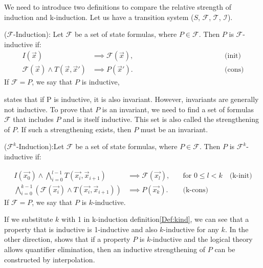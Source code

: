 We need to introduce two definitions to compare the relative strength of induction and k-induction. Let us have a transition system ($S$, $\mathcal{F}$, $\mathcal{T}$, $\mathcal{I}$).
\vspace{\baselineskip}
\begin{definition}
($\mathcal{F}$-Induction\cite{7886665}): Let $\mathcal{F}$ be a set of state formulas, where $P \in \mathcal{F}$. Then \( P \) is $\mathcal{F}$-inductive if:
\begin{align*}
    I(\vec{x})
    &\implies \mathcal{F}(\vec{x}), \hspace{5cm}&\text{(init)} \\
    \mathcal{F}(\vec{x}) \land T(\vec{x}, \vec{x}') &\implies P(\vec{x}'). \hspace{5cm}&\text{(cons)}
\end{align*}
If $\mathcal{F} = {P}$, we say that \( P \) is inductive,
\label{Def:ind}
\end{definition}

\vspace{\baselineskip}
\cite{7886665} states that if P is inductive, it is also invariant. However, invariants are generally not inductive. To prove that \( P \) is an invariant, we need to find a set of formulas $\mathcal{F}$ that includes \( P \) and is itself inductive. This set is also called the strengthening of \( P \). If such a strengthening exists, then \( P \) must be an invariant.

\vspace{\baselineskip}
\begin{definition}
($\mathcal{F}^k$-Induction\cite{7886665}):Let $\mathcal{F}$ be a set of state formulas, where $P \in \mathcal{F}$. Then \( P \) is $\mathcal{F}^k$-inductive if:

\begin{align*}
    I(\vec{x_0}) \land \bigwedge_{i = 0}^{l - 1}T(\vec{x_i}, \vec{x}_{i+1})
    &\implies \mathcal{F}(\vec{x_l}), \quad &\text{for } 0 \leq l < k \quad \text{(k-init)} \\
    \bigwedge_{i = 0}^{k - 1}(\mathcal{F}(\vec{x_i}) \land T(\vec{x_i}, \vec{x}_{i+1}))
    &\implies P(\vec{x_k}). \quad &\text{(k-cons)}
\end{align*}
If $\mathcal{F} = {P}$, we say that \( P \) is \( k \)-inductive.
\label{Def:kind}
\end{definition}
If we substitute \( k \) with 1 in k-induction definition\ref{Def:kind}, we can see that a property that is inductive is 1-inductive and also \( k \)-inductive for any \( k \). In the other direction, \cite{7886665} shows that if a property \( P \) is \( k \)-inductive and the logical theory allows quantifier elimination, then an inductive strengthening of \( P \) can be constructed by interpolation.

